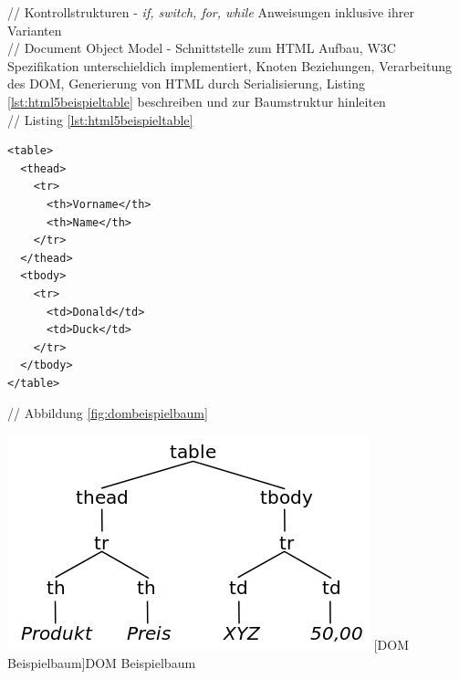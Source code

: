 \documentclass[12pt,a4paper,bibliography=totocnumbered,listof=totocnumbered]{scrartcl}
\begin{document}
// Kontrollstrukturen - \textit{if, switch, for, while} Anweisungen inklusive ihrer Varianten\\

// Document Object Model - Schnittstelle zum HTML Aufbau, W3C Spezifikation unterschieldich implementiert, Knoten Beziehungen, Verarbeitung des DOM, Generierung von HTML durch Serialisierung, Listing \ref{lst:html5beispieltable} beschreiben und zur Baumstruktur hinleiten\\
// Listing \ref{lst:html5beispieltable}
	\vspace{1em}
	\begin{lstlisting}[caption=HTML5 Beispiel Definition, label=lst:html5beispieltable]
<table>
  <thead>
    <tr>
      <th>Vorname</th>
      <th>Name</th>
    </tr>
  </thead>
  <tbody>
    <tr>
      <td>Donald</td>
      <td>Duck</td>
    </tr>
  </tbody>
</table>
	\end{lstlisting}

// Abbildung \ref{fig:dombeispielbaum}\\
	\vspace{1em}
	\begin{minipage}{\linewidth}
		\centering
		\includegraphics[width=0.5\linewidth]{images/dom_sampletree.png}
		[DOM Beispielbaum]{DOM Beispielbaum}
		\label{fig:dombeispielbaum}
	\end{minipage}
\end{document}
